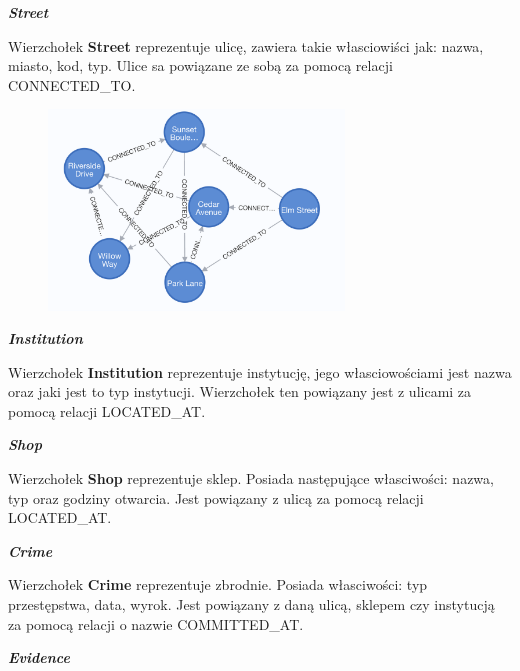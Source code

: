 \documentclass[a4paper,12pt]{article}
\begin{document}
\begin{center}
    \textbf{\textit{Street}}
\end{center}

Wierzchołek \textbf{Street} reprezentuje ulicę, zawiera takie własciowiści jak: nazwa, miasto, kod, typ. Ulice sa powiązane ze sobą za pomocą relacji CONNECTED\_TO.

\begin{figure}[h!]
    \centering
    \includegraphics[width=0.7\textwidth]{streets.png} 
\end{figure}

\begin{center}
    \textbf{\textit{Institution}}
\end{center}

Wierzchołek \textbf{Institution} reprezentuje instytucję, jego własciowościami jest nazwa oraz jaki jest to typ instytucji. Wierzchołek ten powiązany jest z ulicami za pomocą relacji LOCATED\_AT.

\begin{center}
    \textbf{\textit{Shop}}
\end{center}

Wierzchołek \textbf{Shop} reprezentuje sklep. Posiada następujące własciwości: nazwa, typ oraz godziny otwarcia. Jest powiązany z ulicą za pomocą relacji LOCATED\_AT.

\begin{center}
    \textbf{\textit{Crime}}
\end{center}

Wierzchołek \textbf{Crime} reprezentuje zbrodnie. Posiada własciwości: typ przestępstwa, data, wyrok. Jest powiązany z daną ulicą, sklepem czy instytucją za pomocą relacji o nazwie COMMITTED\_AT.

\begin{center}
    \textbf{\textit{Evidence}}
\end{center}
\end{document}
